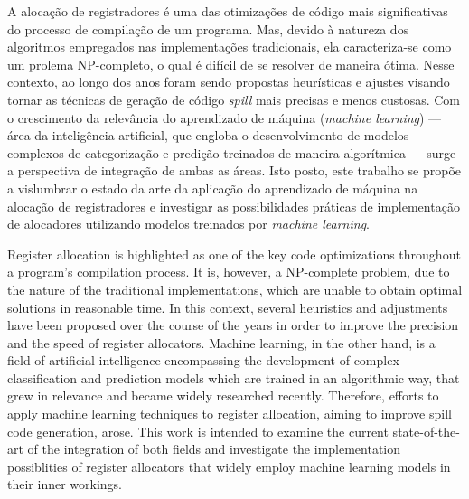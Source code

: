 \documentclass[
	12pt,				%
	openright,			%
	oneside,			%
	a4paper,			%
	tccpreliminar,			%
	]{ABNT-DC-UEL}
\begin{document}
\begin{resumo}
A alocação de registradores é uma das otimizações de código mais significativas do processo de compilação de um programa. Mas, devido à natureza dos algoritmos empregados nas implementações tradicionais, ela caracteriza-se como um prolema NP-completo, o qual é difícil de se resolver de maneira ótima. Nesse contexto, ao longo dos anos foram sendo propostas heurísticas e ajustes visando tornar as técnicas de geração de código \textit{spill} mais precisas e menos custosas. Com o crescimento da relevância do aprendizado de máquina (\textit{machine learning}) --- área da inteligência artificial, que engloba o desenvolvimento de modelos complexos de categorização e predição treinados de maneira algorítmica --- surge a perspectiva de integração de ambas as áreas. Isto posto, este trabalho se propõe a vislumbrar o estado da arte da aplicação do aprendizado de máquina na alocação de registradores e investigar as possibilidades práticas de implementação de alocadores utilizando modelos treinados por \textit{machine learning}.
\end{resumo}

\begin{Abstract}
Register allocation is highlighted as one of the key code optimizations throughout a program's compilation process. It is, however, a NP-complete problem, due to the nature of the traditional implementations, which are unable to obtain optimal solutions in reasonable time. In this context, several heuristics and adjustments have been proposed over the course of the years in order to improve the precision and the speed of register allocators. Machine learning, in the other hand, is a field of artificial intelligence encompassing the development of complex classification and prediction models which are trained in an algorithmic way, that grew in relevance and became widely researched recently. Therefore, efforts to apply machine learning techniques to register allocation, aiming to improve spill code generation, arose. This work is intended to examine the current state-of-the-art of the integration of both fields and investigate the implementation possiblities of register allocators that widely employ machine learning models in their inner workings.
\end{Abstract}

\listoffigures*
\cleardoublepage
\end{document}
